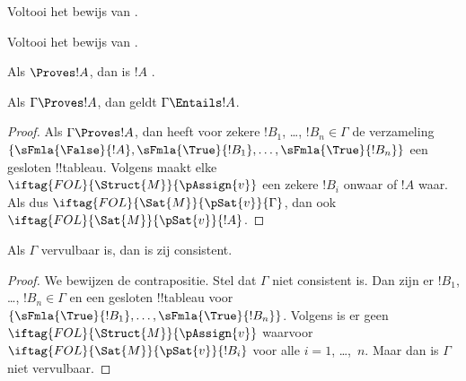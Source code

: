 \documentclass[openany]{memoir}
\begin{document}
\begin{prob}
Voltooi het bewijs van .
\end{prob}
\tagendprob

\begin{prob}
Voltooi het bewijs van .
\end{prob}
\tagendprob

\begin{cor}
Als $\Proves !A$, dan is $!A$ .
\end{cor}

\begin{cor}
Als $\Gamma \Proves !A$, dan geldt $\Gamma \Entails !A$.
\end{cor}

\begin{proof}
  Als $\Gamma \Proves !A$, dan heeft voor zekere $!B_1$, \dots,
  $!B_n \in \Gamma$ de verzameling
  $\{\sFmla{\False}{!A}, \sFmla{\True}{!B_1}, \dots,
  \sFmla{\True}{!B_n}\}$ een gesloten !!{tableau}. Volgens
   maakt elke
  ~$\iftag{FOL}{\Struct{M}}{\pAssign{v}}$
  een zekere $!B_i$ onwaar of $!A$ waar. Als dus
  $\iftag{FOL}{\Sat{M}}{\pSat{v}}{\Gamma}$, dan ook
  $\iftag{FOL}{\Sat{M}}{\pSat{v}}{!A}$.
\end{proof}

\begin{cor}
Als $\Gamma$ vervulbaar is, dan is zij consistent.
\end{cor}

\begin{proof}
We bewijzen de contrapositie. Stel dat $\Gamma$ niet consistent is.
Dan zijn er $!B_1$, \dots, $!B_n \in \Gamma$ en een gesloten
!!{tableau} voor $\{\sFmla{\True}{!B_1}, \dots, \sFmla{\True}{!B_n}\}$.
Volgens  is er geen
$\iftag{FOL}{\Struct{M}}{\pAssign{v}}$ waarvoor
$\iftag{FOL}{\Sat{M}}{\pSat{v}}{!B_i}$ voor alle $i=1$, \dots,~$n$.
Maar dan is $\Gamma$ niet vervulbaar.
\end{proof}
\endgroup

\begingroup
\def\olfilename{OLP-0110}
\def\olfilepath{content/first-order-logic/tableaux/}
\hypertarget{unit-OLP-0110}{}
\end{document}
